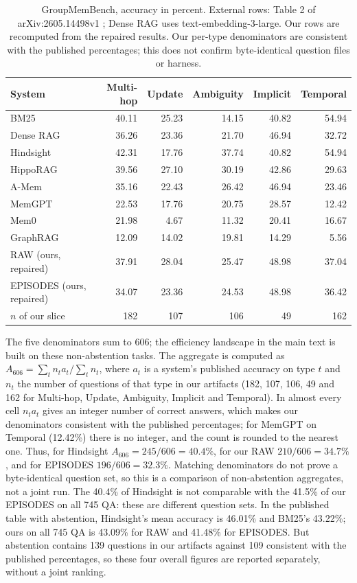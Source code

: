 \documentclass[11pt,a4paper]{article}
\newcommand{\raw}{RAW}
\newcommand{\episodes}{EPISODES}
\begin{document}
\begin{table}[ht]
\centering\small
\begin{tabular}{@{}lrrrrr@{}}
\toprule
System & Multi-hop & Update & Ambiguity & Implicit & Temporal\\
\midrule
BM25 & 40.11 & 25.23 & 14.15 & 40.82 & 54.94\\
Dense RAG & 36.26 & 23.36 & 21.70 & 46.94 & 32.72\\
Hindsight & 42.31 & 17.76 & 37.74 & 40.82 & 54.94\\
HippoRAG & 39.56 & 27.10 & 30.19 & 42.86 & 29.63\\
A-Mem & 35.16 & 22.43 & 26.42 & 46.94 & 23.46\\
MemGPT & 22.53 & 17.76 & 20.75 & 28.57 & 12.42\\
Mem0 & 21.98 & 4.67 & 11.32 & 20.41 & 16.67\\
GraphRAG & 12.09 & 14.02 & 19.81 & 14.29 & 5.56\\
\midrule
\raw{} (ours, repaired) & 37.91 & 28.04 & 25.47 & 48.98 & 37.04\\
\episodes{} (ours, repaired) & 34.07 & 23.36 & 24.53 & 48.98 & 36.42\\
$n$ of our slice & 182 & 107 & 106 & 49 & 162\\
\bottomrule
\end{tabular}
\caption{GroupMemBench, accuracy in percent. External rows: Table 2 of
arXiv:2605.14498v1 \citep{yang2026}; Dense RAG uses text-embedding-3-large. Our rows
are recomputed from the repaired results. Our per-type denominators are consistent
with the published percentages; this does not confirm byte-identical question files
or harness.}
\label{tab:group-external}
\end{table}

The five denominators sum to 606; the efficiency landscape in the main text is built
on these non-abstention tasks. The aggregate is computed as
$A_{606}=\sum_t n_t a_t\big/\sum_t n_t$, where $a_t$ is a system's published accuracy on
type $t$ and $n_t$ the number of questions of that type in our artifacts (182, 107,
106, 49 and 162 for Multi-hop, Update, Ambiguity, Implicit and Temporal). In almost
every cell $n_t a_t$ gives an integer number of correct answers, which makes our
denominators consistent with the published percentages; for MemGPT on Temporal
(12.42\%) there is no integer, and the count is rounded to the nearest one. Thus, for
Hindsight $A_{606}=245/606=40.4\%$, for our RAW $210/606=34.7\%$, and for EPISODES
$196/606=32.3\%$. Matching denominators do not prove a byte-identical question set, so
this is a comparison of non-abstention aggregates, not a joint run. The 40.4\% of
Hindsight is not comparable with the 41.5\% of our EPISODES on all 745 QA: these are
different question sets. In the published table with abstention, Hindsight's mean
accuracy is 46.01\% and BM25's 43.22\%; ours on all 745 QA is 43.09\% for RAW and
41.48\% for EPISODES. But abstention contains 139 questions in our artifacts against
109 consistent with the published percentages, so these four overall figures are
reported separately, without a joint ranking.
\end{document}

